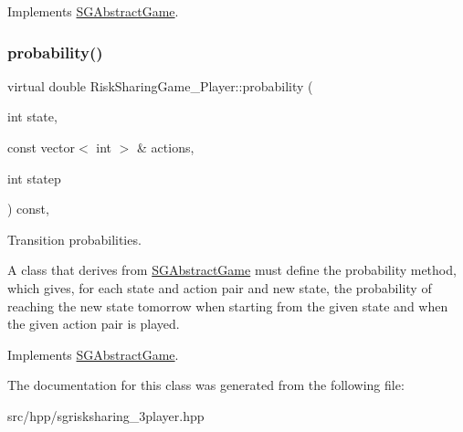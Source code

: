 Implements \hyperlink{classSGAbstractGame_a3fc1cd009d1813f44f1f219e7deb6eef}{S\+G\+Abstract\+Game}.

\mbox{\label{classRiskSharingGame__3Player_a48f478394bae9cf7479519da9b18a987}} 
\subsubsection{\texorpdfstring{probability()}{probability()}}
{\footnotesize\ttfamily virtual double Risk\+Sharing\+Game\+\_\+Player\+::probability (\begin{DoxyParamCaption}\item[{int}]{state,  }\item[{const vector$<$ int $>$ \&}]{actions,  }\item[{int}]{statep }\end{DoxyParamCaption}) const\hspace{0.3cm}{\ttfamily [inline]}, {\ttfamily [virtual]}}



Transition probabilities. 

A class that derives from \hyperlink{classSGAbstractGame}{S\+G\+Abstract\+Game} must define the probability method, which gives, for each state and action pair and new state, the probability of reaching the new state tomorrow when starting from the given state and when the given action pair is played. 

Implements \hyperlink{classSGAbstractGame_a416b31d5020b75de49447ce4f7783b98}{S\+G\+Abstract\+Game}.



The documentation for this class was generated from the following file\+:\begin{DoxyCompactItemize}
\item 
src/hpp/sgrisksharing\+\_\+3player.\+hpp\end{DoxyCompactItemize}
